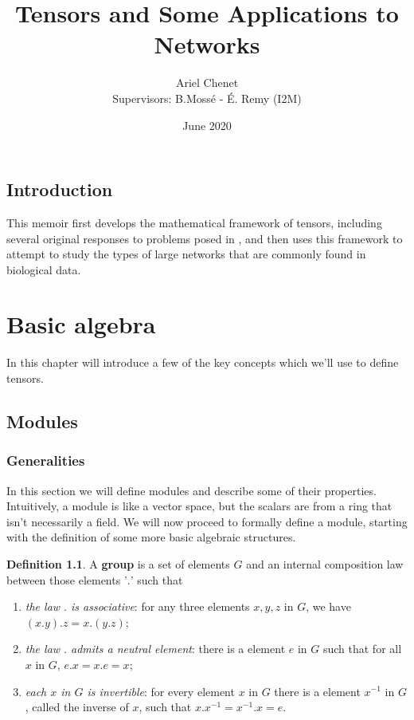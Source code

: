 \documentclass{report}
\title{Tensors and Some Applications to Networks}
\author{Ariel Chenet \\ Supervisors: B.Mossé - É. Remy (I2M)}
\date{June 2020}
\theoremstyle{definition}
\newtheorem{defin}{Definition}
\theoremstyle{remark}
\begin{document}
\maketitle
\vspace{10cm}

\tableofcontents{}




\newpage
\section*{Introduction}

This memoir first develops the mathematical framework of tensors, including several original responses to problems posed in \cite{Godement}, and then uses this framework to attempt to study the types of large networks that are commonly found in biological data. 


\chapter{Basic algebra}


In this chapter will introduce a few of the key concepts which we'll use to define tensors. 

\section{Modules}

\subsection{Generalities}
 In this section we will define modules and describe some of their properties. Intuitively, a module is like a vector space, but the scalars are from a ring that isn't necessarily a field. 
 We will now proceed to formally define a module, starting with the definition of some more basic algebraic structures. 
\begin{defin} A \textbf{group} is a set of elements $G$ and an internal composition law between those elements '$.$' such that 
\begin{enumerate}
    \item \textit{ the law $.$ is associative}: for any three elements $x,y,z$ in $G$, we have $(x . y) . z = x . (y . z)$;
    \item \textit{the law $.$ admits a neutral element}: there is a element $e$ in $G$ such that for all $x$ in $G$, $e . x = x . e = x$;
    \item \textit{each $x$ in $G$ is invertible}: for every element $x$ in $G$ there is a element $x^{-1}$ in $G$, called the inverse of $x$, such that $x . x^{-1}=x^{-1} . x = e$.
\end{enumerate}
 
\end{defin} 
 
\end{document}
